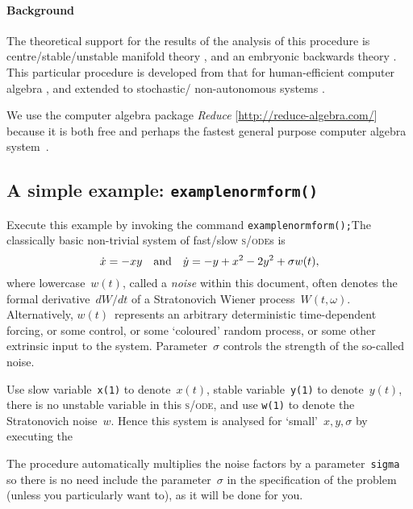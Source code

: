 \documentclass[11pt,a5paper]{article}
\def\sde{\textsc{s/ode}}
\begin{document}
\paragraph{Background}
The theoretical support for the results of the analysis of
this procedure is centre\slash stable\slash unstable
manifold theory \cite[e.g.,][]{Carr81, Knobloch82,
Haragus2011, Roberts2014a}, and an embryonic backwards
theory \cite[]{Roberts2018a}. This particular procedure is
developed from that for human-efficient computer algebra
\cite[]{Roberts96a}, and extended to stochastic\slash
non-autonomous systems \cite[]{Chao95, Roberts06k}.

We use the computer algebra package \emph{Reduce} 
[\url{http://reduce-algebra.com/}] because it is both free 
and perhaps the fastest general purpose computer algebra 
system~\cite[e.g.]{Fateman2002}.



\subsection{A simple example: \texttt{examplenormform()}} 
\label{ss:eg}
Execute this example by invoking the command
\verb|examplenormform();|\quad The classically basic
non-trivial system of fast/slow \sde{}s
\cite[\S19.1]{Roberts2014a} is
\begin{equation*}
\dot x=-xy \quad\mbox{and}\quad \dot y=-y+x^2-2y^2+\sigma w(t),
\end{equation*}
where lowercase~$w(t)$, called a \emph{noise} within this
document,  often denotes the formal derivative~$dW/dt$ of a
Stratonovich Wiener process~$W(t,\omega)$. Alternatively,
\(w(t)\)~represents an arbitrary deterministic
time-dependent forcing, or some control, or some `coloured'
random process, or some other extrinsic input to the system.
Parameter~$\sigma$ controls the strength of the so-called
noise.

Use slow variable~\verb|x(1)| to denote~$x(t)$, stable
variable~\verb|y(1)| to denote~$y(t)$, there is no unstable
variable in this \sde, and use \verb|w(1)| to denote the
Stratonovich noise~$w$. Hence this system is analysed for
`small'~\(x,y,\sigma\) by executing the 
The procedure automatically multiplies the noise factors by
a parameter~\verb|sigma| so there is no need include the
parameter~$\sigma$ in the specification of the problem
(unless you particularly want to), as it will be done for
you.
\end{document}
